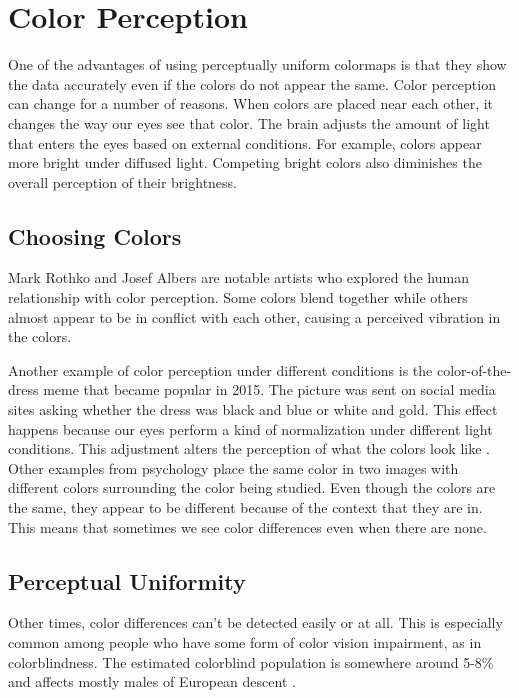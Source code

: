 \documentclass[journal]{IEEEtran}
\begin{document}
\section{Color Perception}

One of the advantages of using perceptually uniform colormaps is
that they show the data accurately even if the colors do not appear
the same. Color perception can change for a number of reasons. When 
colors are placed near each other, it changes the way our eyes see that color.
The brain adjusts the amount of light that enters the eyes based
on external conditions. For example, colors appear more bright under diffused
light. Competing bright colors also diminishes the overall perception
of their brightness.

\subsection{Choosing Colors}

Mark Rothko and Josef Albers are notable artists who explored the human relationship
with color perception. Some colors blend together while others almost appear to be in
conflict with each other, causing a perceived vibration in the colors.

Another example of color perception under different conditions is the 
color-of-the-dress meme that became popular in 2015. The picture was
sent on social media sites asking whether the dress was black and blue
or white and gold. This effect happens because our eyes perform a kind 
of normalization under different light conditions. This adjustment alters
the perception of what the colors look like \cite{viridis}. Other examples from psychology 
place the same color in two images with different colors surrounding the
color being studied. Even though the colors are the same, they appear to be 
different because of the context that they are in. This means that sometimes
we see color differences even when there are none.

\subsection{Perceptual Uniformity}

Other times, color differences can't be detected easily or at all. This is 
especially common among people who have some form of color vision impairment,
as in colorblindness. The estimated colorblind population is somewhere around 5-8\%
and affects mostly males of European descent \cite{colormapping}.
\end{document}
